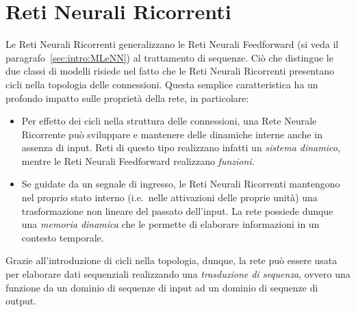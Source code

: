 \section{Reti Neurali Ricorrenti}\label{sec:intro:rnn}
Le Reti Neurali Ricorrenti \cite{Tsoi:DiscreteTimeRNN, Haykin:NN} generalizzano le Reti Neurali Feedforward (si veda il paragrafo~\ref{sec:intro:MLeNN}) al trattamento di sequenze. Ciò che distingue le due classi di modelli risiede nel fatto che le Reti Neurali Ricorrenti presentano cicli nella topologia delle connessioni. Questa semplice caratteristica ha un profondo impatto sulle proprietà della rete, in particolare:
\begin{itemize}
\item Per effetto dei cicli nella struttura  delle connessioni, una Rete Neurale Ricorrente può sviluppare e mantenere delle dinamiche interne anche in assenza di input. Reti di questo tipo realizzano infatti un \emph{sistema dinamico}, mentre le Reti Neurali Feedforward realizzano \emph{funzioni}.
\item Se guidate da un segnale di ingresso, le Reti Neurali Ricorrenti mantengono nel proprio stato interno (i.e.\ nelle attivazioni delle proprie unità) una trasformazione non lineare del passato dell'input. La rete possiede dunque una \emph{memoria dinamica} che le permette di elaborare informazioni in un contesto temporale.
\end{itemize}
Grazie all'introduzione di cicli nella topologia, dunque, la rete può essere usata per elaborare dati sequenziali realizzando una \emph{trasduzione di sequenza}, ovvero una funzione da un dominio di sequenze di input ad un dominio di sequenze di output. 

